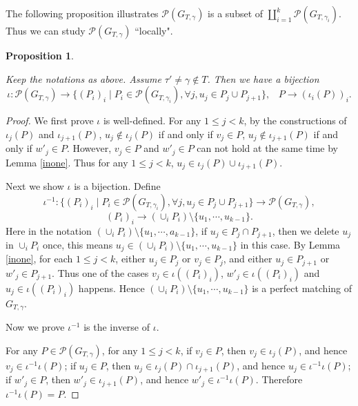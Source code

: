 \documentclass[10pt]{amsart}
\theoremstyle{theorems}
\newtheorem{Proposition}[Theorem]{Proposition}
\begin{document}
\medskip

The following proposition illustrates $\mathcal P(G_{T,\gamma})$ is a subset of $\coprod_{i=1}^{k}\mathcal P(G_{T,\gamma_i})$. Thus we can study $\mathcal P(G_{T,\gamma})$ ``locally".

\medskip

\begin{Proposition}\label{decompose}

Keep the notations as above. Assume $\tau'\neq \gamma \notin T$. Then we have a bijection
$$\iota: \mathcal P(G_{T,\gamma})\rightarrow \{(P_i)_{i} \mid P_i\in \mathcal P(G_{T,\gamma_i}), \forall j, u_j\in P_j\cup P_{j+1}\},\;\;\;P\rightarrow (\iota_i(P))_{i}.$$

\end{Proposition}

\begin{proof}
We first prove $\iota$ is well-defined. For any $1\leq j<k$, by the constructions of $\iota_j(P)$ and $\iota_{j+1}(P)$, $u_j\notin \iota_j(P)$ if and only if $v_j\in P$, $u_j\notin \iota_{j+1}(P)$ if and only if $w'_j\in P$. However, $v_j\in P$ and $w'_j\in P$ can not hold at the same time by Lemma \ref{inone}. Thus for any $1\leq j<k$, $u_j\in \iota_j(P)\cup \iota_{j+1}(P)$.

Next we show $\iota$ is a bijection. Define
$$\iota^{-1}: \{(P_i)_{i}\;|\;P_i\in \mathcal P(G_{T,\gamma_i}), \forall j, u_j\in P_j\cup P_{j+1}\}\rightarrow \mathcal P(G_{T,\gamma}),$$
$$(P_i)_i\rightarrow (\cup_{i} P_i)\setminus \{u_1,\cdots,u_{k-1}\}.$$
Here in the notation $(\cup_{i} P_i)\setminus \{u_1,\cdots,a_{k-1}\}$, if $u_j\in P_j\cap P_{j+1}$, then we delete $u_j$ in $\cup_{i} P_i$ once, this means $u_j\in (\cup_{i} P_i)\setminus \{u_1,\cdots,u_{k-1}\}$ in this case. By Lemma \ref{inone}, for each $1\leq j<k$, either $u_j\in P_j$ or $v_j\in P_j$, and either $u_j\in P_{j+1}$ or $w'_j\in P_{j+1}$. Thus one of the cases $v_j\in \iota((P_i)_i)$, $w'_j\in \iota((P_i)_i)$ and $u_j\in \iota((P_i)_i)$ happens. Hence $(\cup_{i} P_i)\setminus \{u_1,\cdots,u_{k-1}\}$ is a perfect matching of $G_{T,\gamma}$.

Now we prove $\iota^{-1}$ is the inverse of $\iota$.

For any $P\in \mathcal P(G_{T,\gamma})$, for any $1\leq j<k$, if $v_j\in P$, then $v_j\in \iota_j(P)$, and hence $v_j\in \iota^{-1}\iota(P)$; if $u_j\in P$, then $u_j\in \iota_j(P)\cap \iota_{j+1}(P)$, and hence $u_j\in \iota^{-1}\iota(P)$; if $w'_j\in P$, then $w'_j\in \iota_{j+1}(P)$, and hence $w'_j\in \iota^{-1}\iota(P)$. Therefore $\iota^{-1}\iota(P)=P$.


\end{proof}
\end{document}
